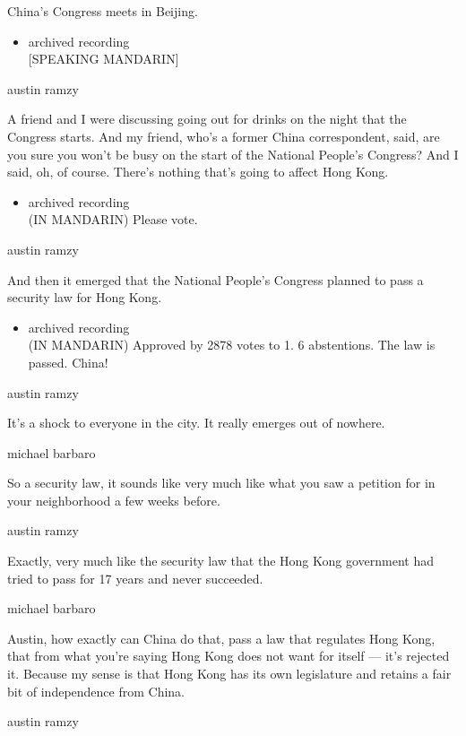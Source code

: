 China's Congress meets in Beijing.

\begin{itemize}
\tightlist
\item
  archived recording\\
  {[}SPEAKING MANDARIN{]}
\end{itemize}

austin ramzy

A friend and I were discussing going out for drinks on the night that
the Congress starts. And my friend, who's a former China correspondent,
said, are you sure you won't be busy on the start of the National
People's Congress? And I said, oh, of course. There's nothing that's
going to affect Hong Kong.

\begin{itemize}
\tightlist
\item
  archived recording\\
  (IN MANDARIN) Please vote.
\end{itemize}

austin ramzy

And then it emerged that the National People's Congress planned to pass
a security law for Hong Kong.

\begin{itemize}
\tightlist
\item
  archived recording\\
  (IN MANDARIN) Approved by 2878 votes to 1. 6 abstentions. The law is
  passed. China!
\end{itemize}

austin ramzy

It's a shock to everyone in the city. It really emerges out of nowhere.

michael barbaro

So a security law, it sounds like very much like what you saw a petition
for in your neighborhood a few weeks before.

austin ramzy

Exactly, very much like the security law that the Hong Kong government
had tried to pass for 17 years and never succeeded.

michael barbaro

Austin, how exactly can China do that, pass a law that regulates Hong
Kong, that from what you're saying Hong Kong does not want for itself
--- it's rejected it. Because my sense is that Hong Kong has its own
legislature and retains a fair bit of independence from China.

austin ramzy

